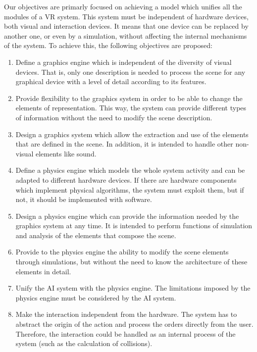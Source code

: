 \documentclass[12pt]{article}
\begin{document}
Our objectives are primarly focused on achieving a model which unifies all the modules of a VR
system. This system must be independent of hardware devices, both visual and interaction devices.
It means that one device can be replaced by another one, or even by a simulation, without affecting
the internal mechanisms of the system. To achieve this, the following objectives are proposed:

\begin{enumerate}
    \item Define a graphics engine which is independent of the diversity of visual
devices. That is, only one description is needed to process the scene for any graphical device with
a level of detail according to its features.

    \item Provide flexibility to the graphics system in order to be
able to change the elements of representation. This way, the system can
provide different types of information without the need to modify the scene
description.

    \item Design a graphics system which allow the extraction and use of the
elements that are defined in the scene. In addition, it is intended to handle other non-visual
elements like sound.

    \item Define a physics engine which models the whole system activity
and can be adapted to different hardware devices. If there are hardware components which implement
physical algorithms, the system must exploit them, but if not, it should be implemented with
software.

    \item Design a physics engine which can provide the information needed by the graphics system at any time. It is intended to perform functions of simulation and analysis of the elements that compose the scene.

    \item Provide to the physics engine the ability to modify the scene
elements through simulations, but without the need to know the architecture of these elements in
detail.

    \item Unify the AI system with the physics engine. The limitations
imposed by the physics engine must be considered by the AI system.

    \item Make the interaction independent from the hardware. The system has to abstract the origin of the action and process the orders directly from the user. Therefore, the interaction could be handled as an internal process of the system (such as the calculation of collisions).


\end{enumerate}
\end{document}
